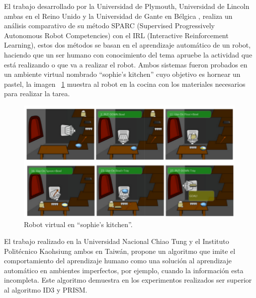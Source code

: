 El trabajo desarrollado por la Universidad de Plymouth, Universidad de
 Lincoln ambas en el Reino Unido y la Universidad de Gante en Bélgica
 \cite{Senft2016}, realiza un análisis comparativo de su método SPARC (Supervised
 Progressively Autonomous Robot Competencies) con el IRL (Interactive
 Reinforcement Learning), estos dos métodos se basan en el aprendizaje 
 automático de un robot, haciendo que un ser humano con conocimiento del tema
 apruebe la actividad que está realizando o que va a realizar el robot.
 Ambos sistemas fueron probados en un ambiente virtual nombrado ``sophie’s
 kitchen'' cuyo objetivo es hornear un pastel, la imagen ~\ref{fig:sparcrob}
 muestra al robot en la cocina con los materiales necesarios para realizar la
 tarea. 
 
\begin{figure}[H]
\centering
\includegraphics[width=0.8\columnwidth]{CapituloI/Imagenes/Sparc.png}
\caption{Robot virtual en “sophie’s kitchen”.}
\label{fig:sparcrob}
\end{figure}


El trabajo realizado en la Universidad Nacional Chiao Tung y el Instituto
 Politécnico Kaohsiung ambos en Taiwán\cite{Chang1996}, propone un algoritmo
 que imite el comportamiento del aprendizaje humano como una solución al
 aprendizaje automático en ambientes imperfectos, por ejemplo, cuando la
 información esta incompleta. Este algoritmo demuestra en los experimentos
 realizados ser superior al algoritmo ID3 y PRISM.